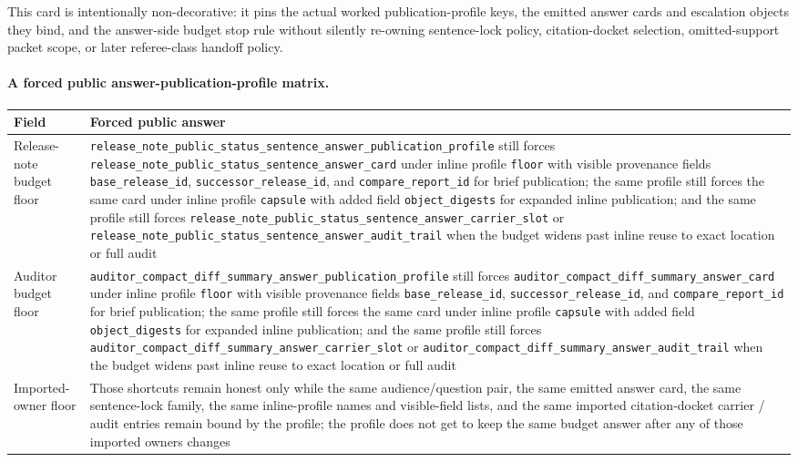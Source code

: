 \documentclass[11pt]{article}
\begin{document}
This card is intentionally non-decorative: it pins the actual worked publication-profile keys, the emitted answer cards and escalation objects they bind, and the answer-side budget stop rule without silently re-owning sentence-lock policy, citation-docket selection, omitted-support packet scope, or later referee-class handoff policy.\cite{series:workedexample}

\paragraph{A forced public answer-publication-profile matrix.}
\begin{table}[t]
\centering
\small
\begin{tabularx}{\linewidth}{@{}lX@{}}
\toprule
Field & Forced public answer \\
\midrule
Release-note budget floor & \nolinkurl{release_note_public_status_sentence_answer_publication_profile} still forces \nolinkurl{release_note_public_status_sentence_answer_card} under inline profile \nolinkurl{floor} with visible provenance fields \nolinkurl{base_release_id}, \nolinkurl{successor_release_id}, and \nolinkurl{compare_report_id} for brief publication; the same profile still forces the same card under inline profile \nolinkurl{capsule} with added field \nolinkurl{object_digests} for expanded inline publication; and the same profile still forces \nolinkurl{release_note_public_status_sentence_answer_carrier_slot} or \nolinkurl{release_note_public_status_sentence_answer_audit_trail} when the budget widens past inline reuse to exact location or full audit \\
Auditor budget floor & \nolinkurl{auditor_compact_diff_summary_answer_publication_profile} still forces \nolinkurl{auditor_compact_diff_summary_answer_card} under inline profile \nolinkurl{floor} with visible provenance fields \nolinkurl{base_release_id}, \nolinkurl{successor_release_id}, and \nolinkurl{compare_report_id} for brief publication; the same profile still forces the same card under inline profile \nolinkurl{capsule} with added field \nolinkurl{object_digests} for expanded inline publication; and the same profile still forces \nolinkurl{auditor_compact_diff_summary_answer_carrier_slot} or \nolinkurl{auditor_compact_diff_summary_answer_audit_trail} when the budget widens past inline reuse to exact location or full audit \\
Imported-owner floor & Those shortcuts remain honest only while the same audience/question pair, the same emitted answer card, the same sentence-lock family, the same inline-profile names and visible-field lists, and the same imported citation-docket carrier / audit entries remain bound by the profile; the profile does not get to keep the same budget answer after any of those imported owners changes \\

\end{tabularx}
\end{table}
\end{document}

